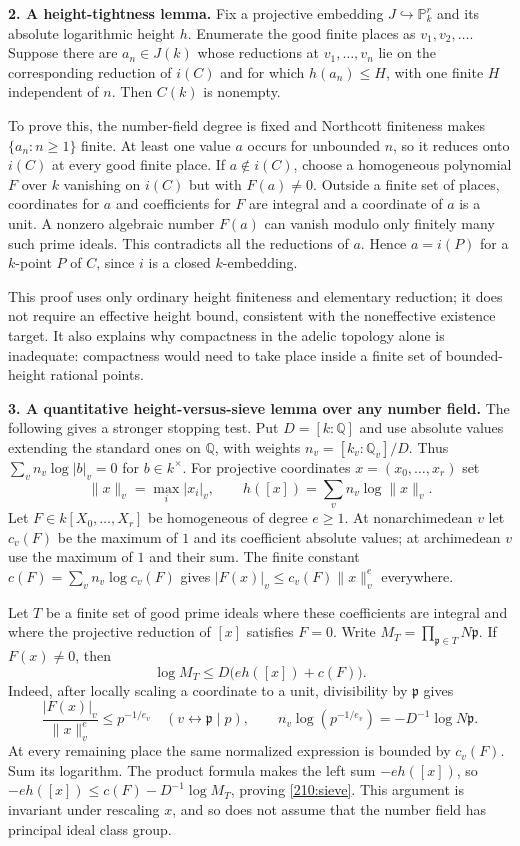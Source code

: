 \documentclass[11pt,a4paper]{article}
\newcommand{\Q}{\mathbb{Q}}
\newcommand{\PP}{\mathbb P}
\begin{document}
\textbf{2. A height-tightness lemma.}
Fix a projective embedding $J\hookrightarrow\PP^r_k$ and its absolute
logarithmic height $h$. Enumerate the good finite places as
$v_1,v_2,\ldots$. Suppose there are $a_n\in J(k)$ whose reductions at
$v_1,\ldots,v_n$ lie on the corresponding reduction of $i(C)$ and for
which $h(a_n)\le H$, with one finite $H$ independent of $n$. Then $C(k)$
is nonempty.

To prove this, the number-field degree is fixed and Northcott finiteness
makes $\{a_n:n\ge1\}$ finite. At least one value $a$ occurs for unbounded
$n$, so it reduces onto $i(C)$ at every good finite place. If
$a\notin i(C)$, choose a homogeneous polynomial $F$ over $k$ vanishing
on $i(C)$ but with $F(a)\ne0$. Outside a finite set of places, coordinates
for $a$ and coefficients for $F$ are integral and a coordinate of $a$ is
a unit. A nonzero algebraic number $F(a)$ can vanish modulo only finitely
many such prime ideals. This contradicts all the reductions of $a$.
Hence $a=i(P)$ for a $k$-point $P$ of $C$, since $i$ is a closed
$k$-embedding.

This proof uses only ordinary height finiteness and elementary reduction;
it does not require an effective height bound, consistent with the
noneffective existence target. It also explains why compactness in the
adelic topology alone is inadequate: compactness would need to take place
inside a finite set of bounded-height rational points.

\textbf{3. A quantitative height-versus-sieve lemma over any number field.}
The following gives a stronger stopping test. Put $D=[k:\Q]$ and use
absolute values extending the standard ones on $\Q$, with weights
$n_v=[k_v:\Q_v]/D$. Thus $\sum_v n_v\log|b|_v=0$ for $b\in k^\times$.
For projective coordinates $x=(x_0,\ldots,x_r)$ set
\[
 \|x\|_v=\max_i|x_i|_v,\qquad h([x])=\sum_v n_v\log\|x\|_v.
\]
Let $F\in k[X_0,\ldots,X_r]$ be homogeneous of degree $e\ge1$.
At nonarchimedean $v$ let $c_v(F)$ be the maximum of $1$ and its coefficient
absolute values; at archimedean $v$ use the maximum of $1$ and their sum.
The finite constant
$c(F)=\sum_v n_v\log c_v(F)$ gives
$|F(x)|_v\le c_v(F)\|x\|_v^e$ everywhere.

Let $T$ be a finite set of good prime ideals where these coefficients are
integral and where the projective reduction of $[x]$ satisfies $F=0$.
Write $M_T=\prod_{\mathfrak p\in T}N\mathfrak p$. If $F(x)\ne0$, then
\begin{equation}\label{210:sieve}
 \log M_T\le D\bigl(eh([x])+c(F)\bigr).
\end{equation}
Indeed, after locally scaling a coordinate to a unit, divisibility by
$\mathfrak p$ gives
\[
 \frac{|F(x)|_v}{\|x\|_v^e}\le p^{-1/e_v}
 \quad(v\leftrightarrow\mathfrak p\mid p),
 \qquad
 n_v\log(p^{-1/e_v})=-D^{-1}\log N\mathfrak p.
\]
At every remaining place the same normalized expression is bounded by
$c_v(F)$. Sum its logarithm. The product formula makes the left sum
$-eh([x])$, so
$-eh([x])\le c(F)-D^{-1}\log M_T$, proving \eqref{210:sieve}.
This argument is invariant under rescaling $x$, and so does not assume
that the number field has principal ideal class group.
\end{document}
